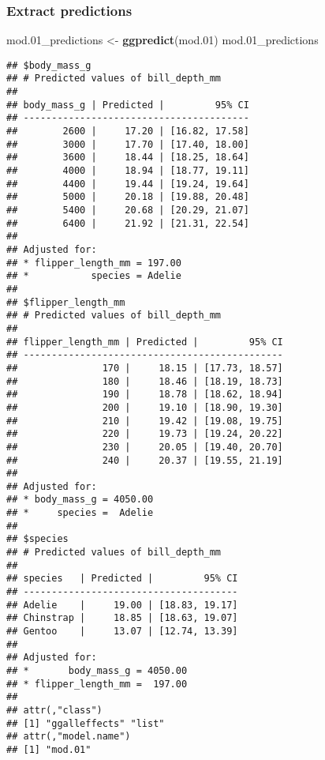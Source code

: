 \documentclass[
]{article}
\newenvironment{Shaded}{\begin{snugshade}}{\end{snugshade}}
\newcommand{\FloatTok}[1]{\textcolor[rgb]{0.00,0.00,0.81}{#1}}
\newcommand{\FunctionTok}[1]{\textcolor[rgb]{0.13,0.29,0.53}{\textbf{#1}}}
\newcommand{\NormalTok}[1]{#1}
\newcommand{\OtherTok}[1]{\textcolor[rgb]{0.56,0.35,0.01}{#1}}
\begin{document}
\hypertarget{extract-predictions}{%
\subsubsection{Extract predictions}\label{extract-predictions}}

\begin{Shaded}
\begin{Highlighting}[]
\NormalTok{mod}\FloatTok{.01}\NormalTok{\_predictions }\OtherTok{\textless{}{-}} \FunctionTok{ggpredict}\NormalTok{(mod}\FloatTok{.01}\NormalTok{)}
\NormalTok{mod}\FloatTok{.01}\NormalTok{\_predictions}
\end{Highlighting}
\end{Shaded}

\begin{verbatim}
## $body_mass_g
## # Predicted values of bill_depth_mm
## 
## body_mass_g | Predicted |         95% CI
## ----------------------------------------
##        2600 |     17.20 | [16.82, 17.58]
##        3000 |     17.70 | [17.40, 18.00]
##        3600 |     18.44 | [18.25, 18.64]
##        4000 |     18.94 | [18.77, 19.11]
##        4400 |     19.44 | [19.24, 19.64]
##        5000 |     20.18 | [19.88, 20.48]
##        5400 |     20.68 | [20.29, 21.07]
##        6400 |     21.92 | [21.31, 22.54]
## 
## Adjusted for:
## * flipper_length_mm = 197.00
## *           species = Adelie
## 
## $flipper_length_mm
## # Predicted values of bill_depth_mm
## 
## flipper_length_mm | Predicted |         95% CI
## ----------------------------------------------
##               170 |     18.15 | [17.73, 18.57]
##               180 |     18.46 | [18.19, 18.73]
##               190 |     18.78 | [18.62, 18.94]
##               200 |     19.10 | [18.90, 19.30]
##               210 |     19.42 | [19.08, 19.75]
##               220 |     19.73 | [19.24, 20.22]
##               230 |     20.05 | [19.40, 20.70]
##               240 |     20.37 | [19.55, 21.19]
## 
## Adjusted for:
## * body_mass_g = 4050.00
## *     species =  Adelie
## 
## $species
## # Predicted values of bill_depth_mm
## 
## species   | Predicted |         95% CI
## --------------------------------------
## Adelie    |     19.00 | [18.83, 19.17]
## Chinstrap |     18.85 | [18.63, 19.07]
## Gentoo    |     13.07 | [12.74, 13.39]
## 
## Adjusted for:
## *       body_mass_g = 4050.00
## * flipper_length_mm =  197.00
## 
## attr(,"class")
## [1] "ggalleffects" "list"        
## attr(,"model.name")
## [1] "mod.01"
\end{verbatim}
\end{document}
